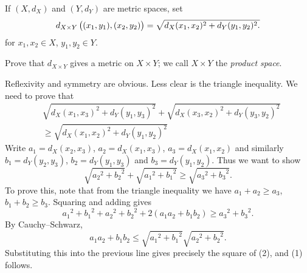 \begin{exercise}
If $(X,d_X)$ and $(Y,d_Y)$ are metric spaces, set
\[d_{X\times Y}\left((x_1,y_1),(x_2,y_2)\right)=\sqrt{d_X(x_1,x_2)^2+d_Y(y_1,y_2)^2.}\]
for $x_1,x_2\in X$, $y_1,y_2\in Y$.

Prove that $d_{X\times Y}$ gives a metric on $X\times Y$; we call $X\times Y$ the \emph{product space}.
\end{exercise}

\begin{solution}
Reflexivity and symmetry are obvious. Less clear is the triangle inequality. We need to prove that
\begin{equation*}\tag{1}
\begin{split}
&\sqrt{d_X(x_1,x_3)^2+d_Y(y_1,y_3)^2}+\sqrt{d_X(x_3,x_2)^2+d_Y(y_3,y_2)^2}\\
&\ge\sqrt{d_X(x_1,x_2)^2+d_Y(y_1,y_2)^2}
\end{split}
\end{equation*}
Write $a_1=d_X(x_2,x_3)$, $a_2=d_X(x_1,x_3)$, $a_3=d_X(x_1,x_2)$ and similarly $b_1=d_Y(y_2,y_3)$, $b_2=d_Y(y_1,y_3)$ and $b_3=d_Y(y_1,y_2)$. Thus we want to show
\begin{equation*}\tag{2}
\sqrt{{a_2}^2+{b_2}^2}+\sqrt{{a_1}^2+{b_1}^2}\ge\sqrt{{a_3}^2+{b_3}^2}.
\end{equation*}
To prove this, note that from the triangle inequality we have $a_1+a_2\ge a_3$, $b_1+b_2\ge b_3$. Squaring and adding gives
\[{a_1}^2+{b_1}^2+{a_2}^2+{b_2}^2+2(a_1a_2+b_1b_2)\ge {a_3}^2+{b_3}^2.\]
By Cauchy--Schwarz,
\[a_1a_2+b_1b_2\le\sqrt{{a_1}^2+{b_1}^2}\sqrt{{a_2}^2+{b_2}^2}.\]
Substituting this into the previous line gives precisely the square of (2), and (1) follows.
\end{solution}

